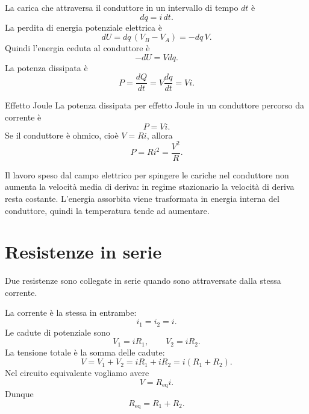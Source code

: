 \documentclass[a4paper]{article}
\begin{document}
La carica che attraversa il conduttore in un intervallo di tempo \(dt\) è
\[
    dq=i\,dt.
\]
La perdita di energia potenziale elettrica è
\[
    dU=dq\,(V_B-V_A)=-dq\,V.
\]
Quindi l'energia ceduta al conduttore è
\[
    -dU=Vdq.
\]
La potenza dissipata è
\[
    P=\frac{dQ}{dt}=V\frac{dq}{dt}=Vi.
\]

\begin{snippettheorem}{Effetto Joule}
    La potenza dissipata per effetto Joule in un conduttore percorso da corrente è
    \[
        P=Vi.
    \]
    Se il conduttore è ohmico, cioè \(V=Ri\), allora
    \[
        P=Ri^2=\frac{V^2}{R}.
    \]
\end{snippettheorem}

Il lavoro speso dal campo elettrico per spingere le cariche nel conduttore non aumenta la velocità media di deriva: in regime stazionario la velocità di deriva resta costante. L'energia assorbita viene trasformata in energia interna del conduttore, quindi la temperatura tende ad aumentare.

\section{Resistenze in serie}

Due resistenze sono collegate in serie quando sono attraversate dalla stessa corrente.

\begin{center}
\end{center}

La corrente è la stessa in entrambe:
\[
    i_1=i_2=i.
\]
Le cadute di potenziale sono
\[
    V_1=iR_1,
    \qquad
    V_2=iR_2.
\]
La tensione totale è la somma delle cadute:
\[
    V=V_1+V_2=iR_1+iR_2=i(R_1+R_2).
\]
Nel circuito equivalente vogliamo avere
\[
    V=R_{\mathrm{eq}}i.
\]
Dunque
\[
    R_{\mathrm{eq}}=R_1+R_2.
\]
\end{document}
